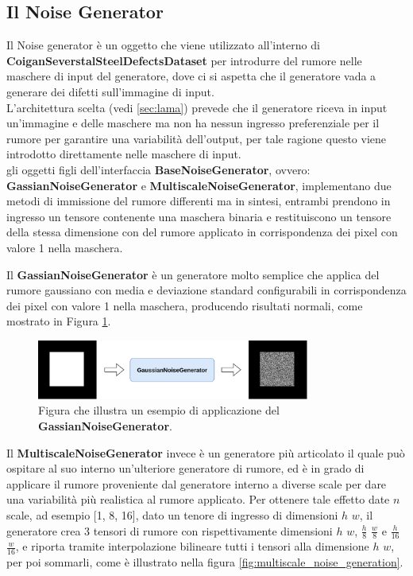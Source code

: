 \subsection{Il Noise Generator}
Il Noise generator è un oggetto che viene utilizzato all'interno di \textbf{CoiganSeverstalSteelDefectsDataset} per introdurre del
rumore nelle maschere di input del generatore, dove ci si aspetta che il generatore vada a generare dei difetti sull'immagine di input.\\
L'architettura scelta (vedi \ref{sec:lama}) prevede che il generatore riceva in input un'immagine e delle maschere ma
non ha nessun ingresso preferenziale per il rumore per garantire una variabilità dell'output, per tale ragione questo viene introdotto 
direttamente nelle maschere di input.\\
gli oggetti figli dell'interfaccia \textbf{BaseNoiseGenerator}, ovvero: \textbf{GassianNoiseGenerator} e \textbf{MultiscaleNoiseGenerator},
implementano due metodi di immissione del rumore differenti ma in sintesi, entrambi prendono in ingresso un tensore contenente una maschera
binaria e restituiscono un tensore della stessa dimensione con del rumore applicato in corrispondenza dei pixel con valore 1 nella maschera.

Il \textbf{GassianNoiseGenerator} è un generatore molto semplice che applica del rumore gaussiano con media e deviazione standard configurabili
in corrispondenza dei pixel con valore 1 nella maschera, producendo risultati normali, come mostrato in Figura \ref{fig:gaussian_noise}.

\begin{figure}[H]
    \centering
    \includegraphics[width=0.8\textwidth]{imgs/Coigan/gaussian noise generator.drawio.png}
    \caption{Figura che illustra un esempio di applicazione del \textbf{GassianNoiseGenerator}.}
    \label{fig:gaussian_noise}
\end{figure}

Il \textbf{MultiscaleNoiseGenerator} invece è un generatore più articolato il quale può ospitare al suo interno un'ulteriore 
generatore di rumore, ed è in grado di applicare il rumore proveniente dal generatore interno a diverse scale per dare una variabilità più realistica al rumore applicato.
Per ottenere tale effetto date $n$ scale, ad esempio [1, 8, 16], dato un tenore di ingresso di dimensioni $h$ $w$, il generatore crea 3 tensori di rumore con rispettivamente
dimensioni $h$ $w$, $\frac{h}{8}$ $\frac{w}{8}$ e $\frac{h}{16}$ $\frac{w}{16}$, e riporta tramite interpolazione bilineare tutti i tensori alla dimensione $h$ $w$,
per poi sommarli, come è illustrato nella figura \ref{fig:multiscale_noise_generation}.

